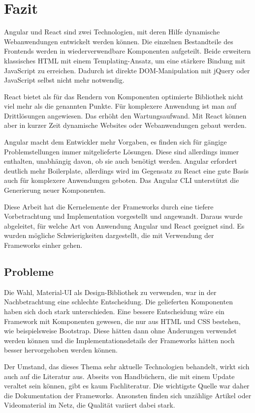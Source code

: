 \chapter{Fazit}
Angular und React sind zwei Technologien, mit deren Hilfe dynamische Webanwendungen entwickelt werden können. Die einzelnen Bestandteile des Frontends werden in wiederverwendbare Komponenten aufgeteilt. Beide erweitern klassisches HTML mit einem Templating-Ansatz, um eine stärkere Bindung mit JavaScript zu erreichen. Dadurch ist direkte DOM-Manipulation mit jQuery oder JavaScript selbst nicht mehr notwendig.

React bietet als für das Rendern von Komponenten optimierte Bibliothek nicht viel mehr als die genannten Punkte. Für komplexere Anwendung ist man auf Drittlösungen angewiesen. Das erhöht den Wartungsaufwand. Mit React können aber in kurzer Zeit dynamische Websites oder Webanwendungen gebaut werden.

Angular macht dem Entwickler mehr Vorgaben, es finden sich für gängige Problemstellungen immer mitgelieferte Lösungen. Diese sind allerdings immer enthalten, unabhängig davon, ob sie auch benötigt werden. Angular erfordert deutlich mehr Boilerplate, allerdings wird im Gegensatz zu React eine gute Basis auch für komplexere Anwendungen geboten. Das Angular CLI unterstützt die Generierung neuer Komponenten.

Diese Arbeit hat die Kernelemente der Frameworks durch eine tiefere Vorbetrachtung und Implementation vorgestellt und angewandt. Daraus wurde abgeleitet, für welche Art von Anwendung Angular und React geeignet sind. Es wurden mögliche Schwierigkeiten dargestellt, die mit Verwendung der Frameworks einher gehen.

\section{Probleme}
Die Wahl, Material-UI als Design-Bibliothek zu verwenden, war in der Nachbetrachtung eine schlechte Entscheidung. Die gelieferten Komponenten haben sich doch stark unterschieden. Eine bessere Entscheidung wäre ein Framework mit Komponenten gewesen, die nur aus HTML und CSS bestehen, wie beispielsweise Bootstrap. Diese hätten dann ohne Änderungen verwendet werden können und die Implementationsdetails der Frameworks hätten noch besser hervorgehoben werden können.

Der Umstand, das dieses Thema sehr aktuelle Technologien behandelt, wirkt sich auch auf die Literatur aus. Abseits von Handbüchern, die mit einem Update veraltet sein können, gibt es kaum Fachliteratur. Die wichtigste Quelle war daher die Dokumentation der Frameworks. Ansonsten finden sich unzählige Artikel oder Videomaterial im Netz, die Qualität variiert dabei stark. 

